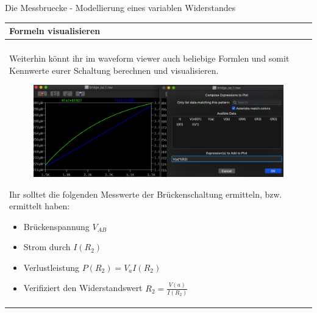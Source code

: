 \begin{frame}[t]{Die Messbruecke - Modellierung eines variablen Widerstandes}

  \begin{spacing}{0.9} \begin{tiny}
      \begin{table}[h!]
        \begin{tabular}{p{10cm}}
          \hline
          \textbf{Formeln visualisieren} \\
          \hline                         \\
          \begin{minipage}{\textwidth}
            Weiterhin könnt ihr im waveform viewer auch beliebige Formlen und somit Kennwerte
            eurer Schaltung berechnen und visualisieren.
            \begin{figure}
              \centering
              \includegraphics[width=0.95\linewidth]{pictures/waveform_formulas.png}
            \end{figure}
            Ihr solltet die folgenden Messwerte der Brückenschaltung ermitteln, bzw. ermittelt haben:
            \begin{itemize}
              \item Brückenspannung $V_{AB}$
              \item Strom durch $I(R_2)$
              \item Verlustleistung $P(R_2)=V_aI(R_2)$
              \item Verifiziert den Widerstandswert $R_2=\frac{V(a)}{I(R_2)}$
            \end{itemize}
          \end{minipage}
          \\
        \end{tabular}

      \end{table}

    \end{tiny} \end{spacing}

\end{frame}
